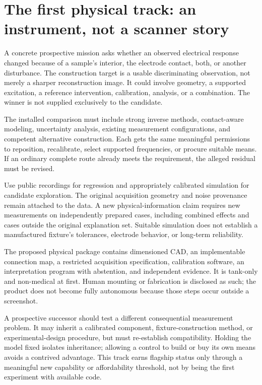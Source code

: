 \documentclass[11pt,letterpaper]{article}
\theoremstyle{remark}\newtheorem{remark}{Remark}[section]
\begin{document}
\section{The first physical track: an instrument, not a scanner story}
\label{sec:physicaltrack}
A concrete prospective mission asks whether an observed electrical response changed because of a sample's interior, the electrode contact, both, or another disturbance. The construction target is a usable discriminating observation, not merely a sharper reconstruction image. It could involve geometry, a supported excitation, a reference intervention, calibration, analysis, or a combination. The winner is not supplied exclusively to the candidate.

The installed comparison must include strong inverse methods, contact-aware modeling, uncertainty analysis, existing measurement configurations, and competent alternative construction. Each gets the same meaningful permissions to reposition, recalibrate, select supported frequencies, or procure suitable means. If an ordinary complete route already meets the requirement, the alleged residual must be revised.

Use public recordings for regression and appropriately calibrated simulation for candidate exploration. The original acquisition geometry and noise provenance remain attached to the data. A new physical-information claim requires new measurements on independently prepared cases, including combined effects and cases outside the original explanation set. Suitable simulation does not establish a manufactured fixture's tolerances, electrode behavior, or long-term reliability.

The proposed physical package contains dimensioned CAD, an implementable connection map, a restricted acquisition specification, calibration software, an interpretation program with abstention, and independent evidence. It is tank-only and non-medical at first. Human mounting or fabrication is disclosed as such; the product does not become fully autonomous because those steps occur outside a screenshot.

A prospective successor should test a different consequential measurement problem. It may inherit a calibrated component, fixture-construction method, or experimental-design procedure, but must re-establish compatibility. Holding the model fixed isolates inheritance; allowing a control to build or buy its own means avoids a contrived advantage. This track earns flagship status only through a meaningful new capability or affordability threshold, not by being the first experiment with available code.
\end{document}
